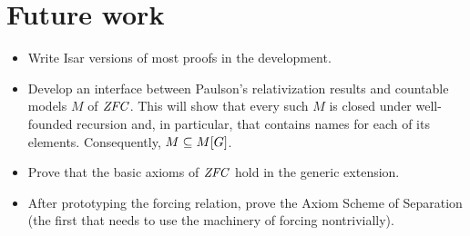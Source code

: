 \section{Future work}
\begin{itemize}
\item Write Isar versions of most proofs in the development.
\item Develop an interface between Paulson's relativization results
  and countable models $M$ of $\mathit{ZFC}$. This will show
  that every such $M$ is closed under well-founded recursion and, in
  particular, that contains names for each of its
  elements. Consequently, $M\subseteq M[G]$.
\item Prove that the basic axioms of $\mathit{ZFC}$ hold in the generic
  extension. 
\item After prototyping the forcing relation, prove the Axiom Scheme
  of Separation (the first that needs to use the machinery of forcing
  nontrivially).
\end{itemize}


